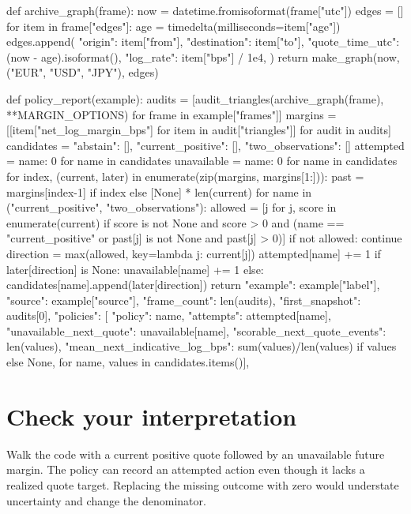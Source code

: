 \documentclass[11pt,oneside,openany]{book}
\begin{document}
\begin{BookCode}
def archive_graph(frame):
    now = datetime.fromisoformat(frame["utc"])
    edges = []
    for item in frame["edges"]:
        age = timedelta(milliseconds=item["age"])
        edges.append({
            "origin": item["from"], "destination": item["to"],
            "quote_time_utc": (now - age).isoformat(), "log_rate": item["bps"] / 1e4,
        })
    return make_graph(now, ("EUR", "USD", "JPY"), edges)
\end{BookCode}
\begin{BookCode}
def policy_report(example):
    audits = [audit_triangles(archive_graph(frame), **MARGIN_OPTIONS) for frame in example["frames"]]
    margins = [[item["net_log_margin_bps"] for item in audit["triangles"]] for audit in audits]
    candidates = {"abstain": [], "current_positive": [], "two_observations": []}
    attempted = {name: 0 for name in candidates}
    unavailable = {name: 0 for name in candidates}
    for index, (current, later) in enumerate(zip(margins, margins[1:])):
        past = margins[index-1] if index else [None] * len(current)
        for name in ("current_positive", "two_observations"):
            allowed = [j for j, score in enumerate(current) if score is not None and score > 0 and
                       (name == "current_positive" or past[j] is not None and past[j] > 0)]
            if not allowed:
                continue
            direction = max(allowed, key=lambda j: current[j])
            attempted[name] += 1
            if later[direction] is None:
                unavailable[name] += 1
            else:
                candidates[name].append(later[direction])
    return {
        "example": example["label"], "source": example["source"], "frame_count": len(audits),
        "first_snapshot": audits[0],
        "policies": [{
            "policy": name, "attempts": attempted[name], "unavailable_next_quote": unavailable[name],
            "scorable_next_quote_events": len(values),
            "mean_next_indicative_log_bps": sum(values)/len(values) if values else None,
        } for name, values in candidates.items()],
    }
\end{BookCode}
\section*{Check your interpretation}
Walk the code with a current positive quote followed by an unavailable future margin. The policy can record an attempted action even though it lacks a realized quote target. Replacing the missing outcome with zero would understate uncertainty and change the denominator.
\end{document}
